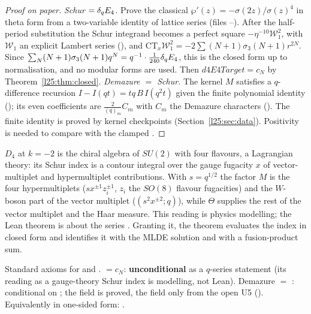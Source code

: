 \begin{proof}[Proof on paper]
\emph{Schur $=\delta_q E_4$.} Prove the classical $\wp'(z)=-\sigma(2z)/\sigma(z)^4$ in theta form from a two-variable identity
of lattice series (files --). After the half-period substitution the Schur
integrand becomes a perfect square $-\eta^{-10}\mathcal W_1^2$, with $\mathcal W_1$ an explicit Lambert series
(), and $\mathrm{CT}_x\mathcal W_1^2=-2\sum(N+1)\sigma_3(N+1)r^{2N}$. Since
$\sum_N(N+1)\sigma_3(N+1)q^{N}=q^{-1}\cdot\frac1{240}\delta_q E_4$, this is the closed form up to normalisation, and no
modular forms are used. Then $d4E4Target=c_N$ by Theorem~\ref{l25:thm:closed}. \emph{Demazure $=$ Schur.} The kernel $M$ satisfies a
$q$-difference recursion $I-I(qt)=tq\,B\,I(q^2t)$ given the finite polynomial identity 
(); its even coefficients are $\frac{2}{(q)_m}C_m$ with $C_m$ the Demazure characters
(). The finite identity is proved by kernel checkpoints (Section~\ref{l25:sec:data}).
Positivity is needed to compare with the clamped .
\end{proof}
\begin{physics}
$D_4$ at $k=-2$ is the chiral algebra of $SU(2)$ with four flavours, a Lagrangian theory: its Schur index is a contour
integral over the gauge fugacity $x$ of vector-multiplet and hypermultiplet contributions. With $s=q^{1/2}$ the
factor $M$ is the four hypermultiplets ($sx^{\pm1}z_i^{\pm1}$, $z_i$ the $SO(8)$ flavour fugacities) and the
$W$-boson part of the vector multiplet ($(s^2x^{\pm2};q)$), while $\Theta$ supplies the rest of the vector multiplet
and the Haar measure. This reading is physics modelling; the Lean theorem is about the series . Granting
it, the theorem evaluates the index in closed form and identifies it with the MLDE solution and with a fusion-product
sum.
\end{physics}
\begin{status}
Standard axioms for  and . 
$=c_N$: \textbf{unconditional} as a $q$-series statement (its reading as a gauge-theory Schur index is modelling, not
Lean). Demazure $=$ : conditional on ; the  field is proved, the
 field only from the open U5 ().
Equivalently in one-sided form: .
\end{status}

